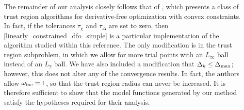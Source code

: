 \documentclass{article}
\begin{document}
%

The remainder of our analysis closely follows that of \cite{Conejo:2013:GCT:2620806.2621814},
which presents a class of trust region algorithms for derivative-free optimization with convex constraints.
In fact, if the tolerances $\tau_{\chi}$ and $\tau_{\Delta}$ are set to zero,  
then \cref{linearly_constrained_dfo_simple} is a particular implementation of the algorithm studied within this reference.
The only modification is in the trust region subproblem, in which we allow for more trial points with an $L_{\infty}$ ball instead of an $L_2$ ball.
We have also included a modification that $\Delta_k \le {\Delta_{\textrm{max}}}$; however, this does not alter any of the convergence results.  In fact, the authors allow $\omega_{\text{inc}} = 1$, so that the trust region radius can never be increased.
It is therefore sufficient to show that the model functions generated by our method satisfy the hypotheses required for their analysis.
\end{document}
